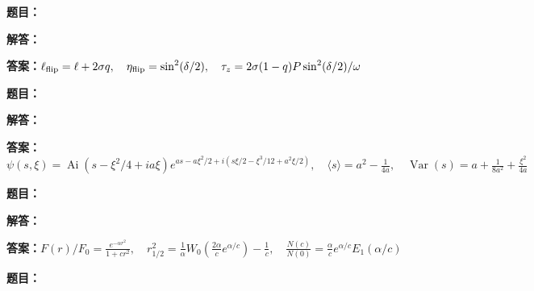 \documentclass[lang=cn,color=blue,11pt]{elegantbook}
\begin{document}
\par\smallskip\noindent\hrulefill\par\medskip
{}\par
\noindent\textbf{题目：}
\par\noindent\textbf{解答：}
\par\noindent\textbf{答案：}\(\displaystyle \ell_{\rm flip}=\ell+2\sigma q,\quad \eta_{\rm flip}=\sin^2(\delta/2),\quad \tau_z=2\sigma(1-q)P\sin^2(\delta/2)/\omega\)\par
\par\smallskip\noindent\hrulefill\par\medskip
{}\par
\noindent\textbf{题目：}
\par\noindent\textbf{解答：}
\par\noindent\textbf{答案：}\(\displaystyle \psi(s,\xi)=\operatorname{Ai}(s-\xi^2/4+ia\xi)e^{as-a\xi^2/2+i(s\xi/2-\xi^3/12+a^2\xi/2)},\quad \langle s\rangle=a^2-\frac1{4a},\quad \operatorname{Var}(s)=a+\frac1{8a^2}+\frac{\xi^2}{4a}\)\par
\par\smallskip\noindent\hrulefill\par\medskip
{}\par
\noindent\textbf{题目：}
\par\noindent\textbf{解答：}
\par\noindent\textbf{答案：}\(\displaystyle F(r)/F_0=\frac{e^{-\alpha r^2}}{1+cr^2},\quad r_{1/2}^2=\frac1\alpha W_0\left(\frac{2\alpha}{c}e^{\alpha/c}\right)-\frac1c,\quad\frac{N(c)}{N(0)}=\frac\alpha c e^{\alpha/c}E_1(\alpha/c)\)\par
\par\smallskip\noindent\hrulefill\par\medskip
{}\par
\noindent\textbf{题目：}
\end{document}
